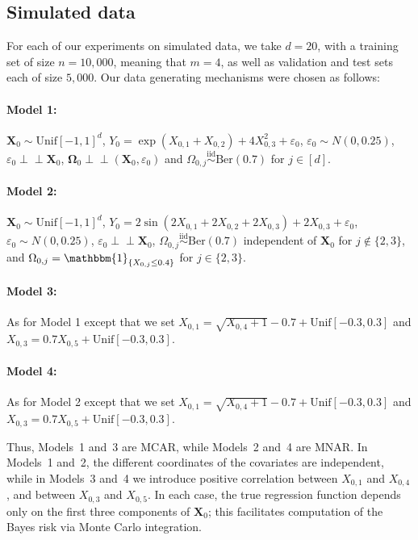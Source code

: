 \documentclass[12pt]{article}
\newcommand{\indep}{\perp\!\!\!\perp}
\begin{document}
\subsection{Simulated data} \label{sec:simulated-data}

For each of our experiments on simulated data, we take $d=20$, with a training set of size $n=10{,}000$, meaning that $m = 4$, as well as validation and test sets each of size $5{,}000$.  Our data generating mechanisms were chosen as follows:

\paragraph{Model 1:} $\bm X_0 \sim \mathrm{Unif}[-1,1]^d$, $Y_0 = \exp(X_{0,1} + X_{0,2}) + 4X_{0,3}^2 + \varepsilon_0$, $\varepsilon_0\sim N(0,0.25)$, $\varepsilon_0 \indep \bm{X}_0$, $\bm\Omega_0 \indep (\bm X_0, \varepsilon_0)$ and $\Omega_{0,j} \overset{\mathrm{iid}}{\sim} \mathrm{Ber}(0.7)$ for $j \in [d]$. 


\paragraph{Model 2:} $\bm X_0 \sim \mathrm{Unif}[-1,1]^d$, $Y_0 = 2\sin(2X_{0,1} + 2X_{0,2} + 2X_{0,3}) + 2X_{0,3} + \varepsilon_0$, $\varepsilon_0\sim N(0,0.25)$, $\varepsilon_0 \indep \bm{X}_0$, $\Omega_{0,j} \overset{\mathrm{iid}}{\sim} \mathrm{Ber}(0.7)$ independent of $\bm X_0$ for $j\notin\{2,3\}$, and $\Omega_{0,j} = \mathbbm{1}_{\{X_{0,j} \leq 0.4\}}$ for $j\in\{2,3\}$. 


\paragraph{Model 3:} As for Model 1 except that we set $X_{0,1} = \sqrt{X_{0,4}+1} - 0.7 + \mathrm{Unif}[-0.3,0.3]$ and $X_{0,3} = 0.7X_{0,5} + \mathrm{Unif}[-0.3,0.3]$.


\paragraph{Model 4:} As for Model 2 except that we set $X_{0,1} = \sqrt{X_{0,4}+1} - 0.7 + \mathrm{Unif}[-0.3,0.3]$ and $X_{0,3} = 0.7X_{0,5} + \mathrm{Unif}[-0.3,0.3]$.

\medskip

Thus, Models~1 and~3 are MCAR, while Models~2 and~4 are MNAR.  In Models~1 and~2, the different coordinates of the covariates are independent, while in Models~3 and~4 we introduce positive correlation between $X_{0,1}$ and $X_{0,4}$, and between $X_{0,3}$ and $X_{0,5}$.  In each case, the true regression function depends only on the first three components of $\bm X_0$; this facilitates computation of the Bayes risk via Monte Carlo integration.  
\end{document}

